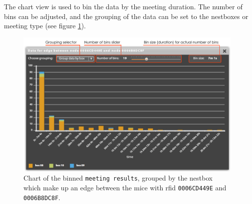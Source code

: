The chart view is used to bin the data by the meeting duration. The number of bins can be adjusted, and the grouping of the data can be set to the nestboxes or meeting type (see figure \ref{fig:edge_data_panel_chart}).

\begin{figure}[!htpb]
\begin{center}
  \includegraphics[width=\textwidth]{assets/pdf/edge_data_panel_chart.pdf}
  \caption[Edge data chart]{Chart of the binned \lstinline|meeting results|, grouped by the nestbox which make up an edge between the mice with rfid \lstinline|0006CD449E| and \lstinline|0006B8DC8F|.}
  \label{fig:edge_data_panel_chart}
\end{center}
\end{figure}   
